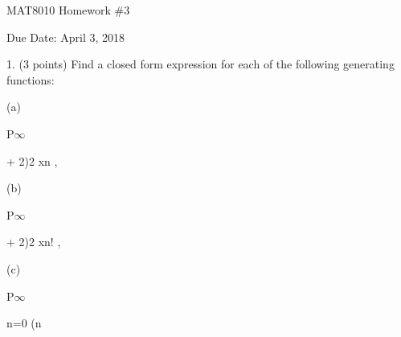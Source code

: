 \documentclass[a4paper,portrait,12pt]{article}
\begin{document}
\begin{flushleft}
MAT8010 Homework \#3
\end{flushleft}


\begin{flushleft}
Due Date: April 3, 2018
\end{flushleft}


\begin{flushleft}
1. (3 points) Find a closed form expression for each of the following generating functions:
\end{flushleft}


\begin{flushleft}
(a)
\end{flushleft}





\begin{flushleft}
P$\infty$
\end{flushleft}





\begin{flushleft}
+ 2)2 xn ,
\end{flushleft}





\begin{flushleft}
(b)
\end{flushleft}





\begin{flushleft}
P$\infty$
\end{flushleft}





\begin{flushleft}
+ 2)2 xn! ,
\end{flushleft}





\begin{flushleft}
(c)
\end{flushleft}





\begin{flushleft}
P$\infty$
\end{flushleft}





\begin{flushleft}
n=0 (n
\end{flushleft}
\end{document}
